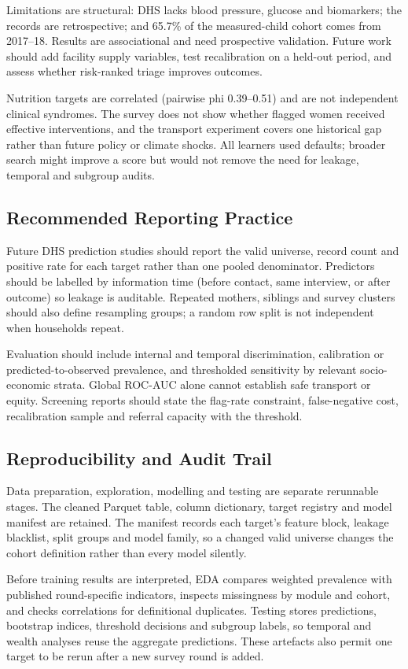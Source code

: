 \documentclass[conference]{IEEEtran}
\begin{document}
Limitations are structural: DHS lacks blood pressure, glucose and biomarkers;
the records are retrospective; and 65.7\% of the measured-child cohort comes
from 2017--18. Results are associational and need prospective validation.
Future work should add facility supply variables, test recalibration on a
held-out period, and assess whether risk-ranked triage improves outcomes.

Nutrition targets are correlated (pairwise phi 0.39--0.51) and are not
independent clinical syndromes. The survey does not show whether flagged women
received effective interventions, and the transport experiment covers one
historical gap rather than future policy or climate shocks. All learners used
defaults; broader search might improve a score but would not remove the need
for leakage, temporal and subgroup audits.

\subsection{Recommended Reporting Practice}
Future DHS prediction studies should report the valid universe, record count
and positive rate for each target rather than one pooled denominator. Predictors
should be labelled by information time (before contact, same interview, or
after outcome) so leakage is auditable. Repeated mothers, siblings and survey
clusters should also define resampling groups; a random row split is not
independent when households repeat.

Evaluation should include internal and temporal discrimination, calibration or
predicted-to-observed prevalence, and thresholded sensitivity by relevant
socio-economic strata. Global ROC-AUC alone cannot establish safe transport or
equity. Screening reports should state the flag-rate constraint, false-negative
cost, recalibration sample and referral capacity with the threshold.

\subsection{Reproducibility and Audit Trail}
Data preparation, exploration, modelling and testing are separate rerunnable
stages. The cleaned Parquet table, column dictionary, target registry and model
manifest are retained. The manifest records each target's feature block,
leakage blacklist, split groups and model family, so a changed valid universe
changes the cohort definition rather than every model silently.

Before training results are interpreted, EDA compares weighted prevalence with
published round-specific indicators, inspects missingness by module and cohort,
and checks correlations for definitional duplicates. Testing stores
predictions, bootstrap indices, threshold decisions and subgroup labels, so
temporal and wealth analyses reuse the aggregate predictions. These artefacts
also permit one target to be rerun after a new survey round is added.
\end{document}

